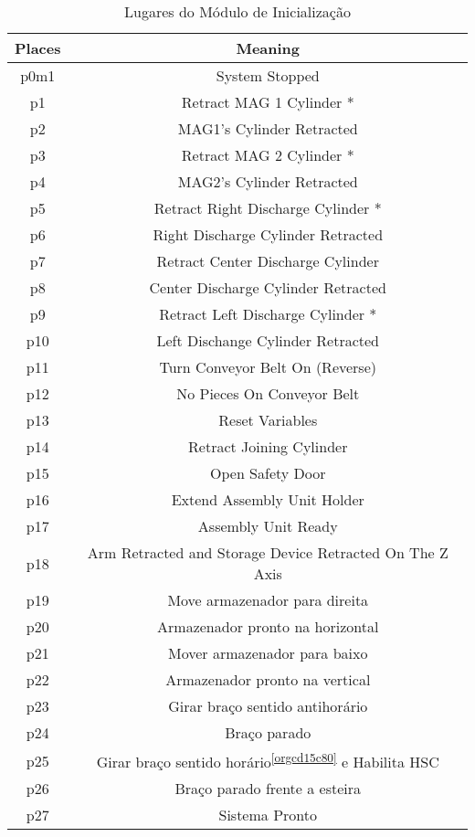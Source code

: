 \begin{table}[htbp]
\caption{Lugares do Módulo de Inicialização}
\centering
\begin{tabular}{c|c}
Places & Meaning\\
\hline
p0m1 & System Stopped\\
p1 & Retract MAG 1 Cylinder *\\
p2 & MAG1's Cylinder Retracted\\
p3 & Retract MAG 2 Cylinder *\\
p4 & MAG2's Cylinder Retracted\\
p5 & Retract Right Discharge Cylinder *\\
p6 & Right Discharge Cylinder Retracted\\
p7 & Retract Center Discharge Cylinder\\
p8 & Center Discharge Cylinder Retracted\\
p9 & Retract Left Discharge Cylinder *\\
p10 & Left Dischange Cylinder Retracted\\
p11 & Turn Conveyor Belt On (Reverse)\\
p12 & No Pieces On Conveyor Belt\\
p13 & Reset Variables\footnotemark\\
p14 & Retract Joining Cylinder\\
p15 & Open Safety Door\\
p16 & Extend Assembly Unit Holder\\
p17 & Assembly Unit Ready\\
p18 & Arm Retracted and Storage Device Retracted On The Z Axis\\
p19 & Move armazenador para direita\\
p20 & Armazenador pronto na horizontal\\
p21 & Mover armazenador para baixo\\
p22 & Armazenador pronto na vertical\\
p23 & Girar braço sentido antihorário\footnotemark\\
p24 & Braço parado\\
p25 & Girar braço sentido horário\textsuperscript{\ref{orgcd15c80}} e Habilita HSC\\
p26 & Braço parado frente a esteira\\
p27 & Sistema Pronto\\
\end{tabular}
\end{table}

